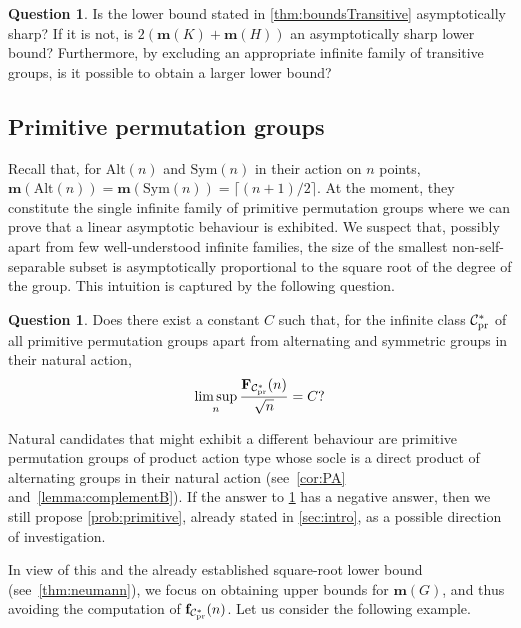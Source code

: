 \documentclass[a4paper]{amsart}
\newcommand{\Sym}{\mathrm{Sym}}
\newcommand{\Alt}{\mathrm{Alt}}
\newcommand{\f}{\mathbf{f}}
\newcommand{\F}{\mathbf{F}}
\newcommand{\m}{\mathbf{m}}
\newcommand{\C}{\mathcal{C}}
\theoremstyle{definition}
\newtheorem{vprasanje}[theorem]{Question}
\begin{document}
\begin{vprasanje}
    Is the lower bound stated in \cref{thm:boundsTransitive} asymptotically sharp? If it is not, is $2(\m(K) + \m(H))$ an asymptotically sharp lower bound? Furthermore, by excluding an appropriate infinite family of transitive groups, is it possible to obtain a larger lower bound?
\end{vprasanje}


\subsection{Primitive permutation groups} Recall that, for $\Alt(n)$ and $\Sym(n)$ in their action on $n$ points, $\m(\Alt(n)) = \m(\Sym(n)) = \lceil (n+1)/2 \rceil$. At the moment, they constitute the single infinite family of primitive permutation groups where we can prove that a linear asymptotic behaviour is exhibited. We suspect that, possibly apart from few well-understood infinite families, the size of the smallest non-self-separable subset is asymptotically proportional to the square root of the degree of the group. This intuition is captured by the following question.

\begin{vprasanje}\label{prob:2}\label{quest:thisOne}
    Does there exist a constant $C$ such that, for the infinite class $\C_{{\rm pr}}^\ast$ of all primitive permutation groups apart from alternating and symmetric groups in their natural action,
    \[ \limsup_n \frac{\F_{\C_{{\rm pr}}^\ast}(n)}{\sqrt{n}} = C ?\]
\end{vprasanje}

Natural candidates that might exhibit a different behaviour are primitive permutation groups of product action type whose socle is a direct product of alternating groups in their natural action (see~\cref{cor:PA} and~\cref{lemma:complementB}). If the answer to \cref{prob:2} has a negative answer, then we still propose \cref{prob:primitive}, already stated in \cref{sec:intro}, as a possible direction of investigation.

In view of this and the already established square-root lower bound (see~\cref{thm:neumann}), we focus on obtaining upper bounds for $\m(G)$, and thus avoiding the computation of $\f_{{\C_{{\rm pr}}^\ast}}(n)$. Let us consider the following example.
\end{document}
